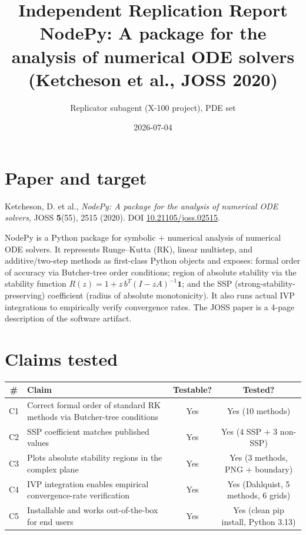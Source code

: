 \documentclass[11pt]{article}
\title{Independent Replication Report \\ \large NodePy: A package for the analysis of numerical ODE solvers \\ (Ketcheson et al., JOSS 2020)}
\author{Replicator subagent (X-100 project), PDE set}
\date{2026-07-04}
\begin{document}
\maketitle

\section{Paper and target}

Ketcheson, D. et al., \emph{NodePy: A package for the analysis of numerical
ODE solvers}, JOSS \textbf{5}(55), 2515 (2020). DOI
\href{https://doi.org/10.21105/joss.02515}{10.21105/joss.02515}.

NodePy is a Python package for symbolic $+$ numerical analysis of numerical
ODE solvers. It represents Runge--Kutta (RK), linear multistep, and
additive/two-step methods as first-class Python objects and exposes:
formal order of accuracy via Butcher-tree order conditions; region of
absolute stability via the stability function
$R(z) = 1 + z\,b^{T}(I - zA)^{-1}\mathbf{1}$; and the SSP
(strong-stability-preserving) coefficient (radius of absolute
monotonicity). It also runs actual IVP integrations to empirically verify
convergence rates. The JOSS paper is a 4-page description of the software
artifact.

\section{Claims tested}

\begin{longtable}{clcc}
\toprule
\# & Claim & Testable? & Tested? \\
\midrule
C1 & Correct formal order of standard RK methods via Butcher-tree conditions & Yes & Yes (10 methods) \\
C2 & SSP coefficient matches published values                                 & Yes & Yes (4 SSP $+$ 3 non-SSP) \\
C3 & Plots absolute stability regions in the complex plane                    & Yes & Yes (3 methods, PNG $+$ boundary) \\
C4 & IVP integration enables empirical convergence-rate verification          & Yes & Yes (Dahlquist, 5 methods, 6 grids) \\
C5 & Installable and works out-of-the-box for end users                       & Yes & Yes (clean pip install, Python 3.13) \\
\bottomrule
\end{longtable}
\end{document}
